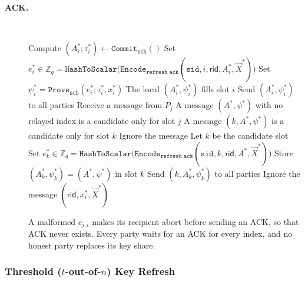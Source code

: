 \documentclass[11pt]{article}
\newcommand{\sid}{\ensuremath{\mathtt{sid}}}
\newcommand{\commit}[1]{\ensuremath{\mathtt{Commit}_{\mathtt{#1}}}}
\newcommand{\hashtoscalar}{\ensuremath{\mathtt{HashToScalar}}}
\newcommand{\prove}[1]{\ensuremath{\mathtt{Prove}_{\mathtt{#1}}}}
\newcommand{\verify}[1]{\ensuremath{\mathtt{Verify}_{\mathtt{#1}}}}
\newcommand{\Encode}[1][]{\ensuremath{\mathtt{Encode}_{\mathtt{#1}}}}
\newcommand{\rid}{\textsf{rid}}
\newcommand{\Z}{\mathbb{Z}}
\newcommand{\?}[1]{\stackrel{?}{#1}}
\begin{document}
\begin{description}
    \item[\textbf{ACK.}] \
    \begin{algorithmic}[1]
        \State Compute $(A^*_i; \tau^*_i) \gets \commit{sch}()$
        \State Set $e^*_i \in \Z_q = \hashtoscalar\bigl(\Encode[refresh\_ack](\sid, i, \rid, A^*_i, \vec X^*)\bigr)$
        \State Set $\psi^*_i = \prove{sch}(e^*_i; \tau^*_i, x^*_i)$
        \State The local $(A^*_i, \psi^*_i)$ fills slot $i$
        \State Send $(A^*_i, \psi^*_i)$ to all parties
         
            \State Receive a message from $P_j$
            \State A message $(A^*, \psi^*)$ with no relayed index is a candidate only for slot $j$
            \State A message $(k, A^*, \psi^*)$ is a candidate only for slot $k$
                \State Ignore the message
            \Else
                \State Let $k$ be the candidate slot
                \State Set $e^*_k \in \Z_q = \hashtoscalar\bigl(\Encode[refresh\_ack](\sid, k, \rid, A^*, \vec X^*)\bigr)$
                \If{$\verify{sch}(X^*_k, A^*, e^*_k, \psi^*)$}
                    \State Store $(A^*_k, \psi^*_k) = (A^*, \psi^*)$ in slot $k$
                    \State Send $(k, A^*_k, \psi^*_k)$ to all parties
                \Else
                    \State Ignore the message
                \EndIf
            \EndIf
        \EndWhile
        \State \Return $(\rid, x^*_i, \vec X^*)$
    \end{algorithmic}

    A malformed $c_{j,i}$ makes its recipient abort before sending an ACK, so that ACK never exists.
    Every party waits for an ACK for every index, and no honest party replaces its key share.

\end{description}

\subsubsection{Threshold ($t$-out-of-$n$) Key Refresh}
\label{sec:t-of-n-refresh}
\end{document}

